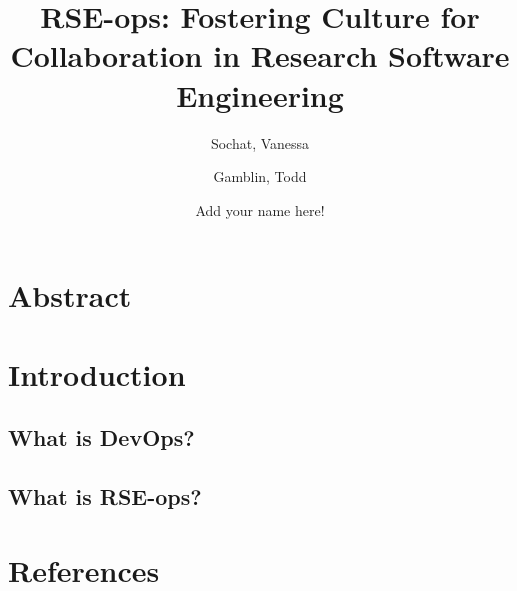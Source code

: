 \documentclass{article}
\title{RSE-ops: Fostering Culture for Collaboration in Research Software Engineering}
\author{
  Sochat, Vanessa\\
  \and
  Gamblin, Todd\\
  \and
  Add your name here!
}
\begin{document}
\maketitle

\section{Abstract}


\section{Introduction}


\subsection{What is DevOps?}

\subsection{What is RSE-ops?}

























\section{References}


\end{document}
